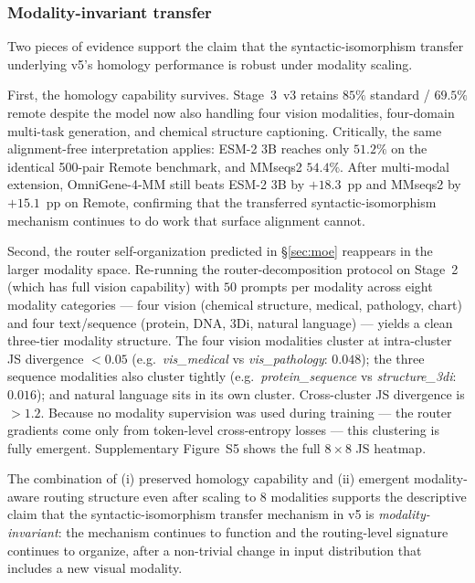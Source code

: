 \documentclass[11pt]{article}
\begin{document}
\subsubsection{Modality-invariant transfer}

Two pieces of evidence support the claim that the syntactic-isomorphism transfer underlying v5's homology performance is robust under modality scaling.

First, the homology capability survives. Stage~3~v3 retains $85\%$ standard / $69.5\%$ remote despite the model now also handling four vision modalities, four-domain multi-task generation, and chemical structure captioning. Critically, the same alignment-free interpretation applies: ESM-2 3B reaches only $51.2\%$ on the identical 500-pair Remote benchmark, and MMseqs2 $54.4\%$. After multi-modal extension, OmniGene-4-MM still beats ESM-2 3B by $+18.3$~pp and MMseqs2 by $+15.1$~pp on Remote, confirming that the transferred syntactic-isomorphism mechanism continues to do work that surface alignment cannot.

Second, the router self-organization predicted in \S\ref{sec:moe} reappears in the larger modality space. Re-running the router-decomposition protocol on Stage~2 (which has full vision capability) with $50$ prompts per modality across eight modality categories --- four vision (chemical structure, medical, pathology, chart) and four text/sequence (protein, DNA, 3Di, natural language) --- yields a clean three-tier modality structure. The four vision modalities cluster at intra-cluster JS divergence $<0.05$ (e.g.\ \textit{vis\_medical} vs \textit{vis\_pathology}: $0.048$); the three sequence modalities also cluster tightly (e.g.\ \textit{protein\_sequence} vs \textit{structure\_3di}: $0.016$); and natural language sits in its own cluster. Cross-cluster JS divergence is $>1.2$. Because no modality supervision was used during training --- the router gradients come only from token-level cross-entropy losses --- this clustering is fully emergent. Supplementary Figure~S5 shows the full $8\!\times\!8$ JS heatmap.

The combination of (i) preserved homology capability and (ii) emergent modality-aware routing structure even after scaling to 8 modalities supports the descriptive claim that the syntactic-isomorphism transfer mechanism in v5 is \emph{modality-invariant}: the mechanism continues to function and the routing-level signature continues to organize, after a non-trivial change in input distribution that includes a new visual modality.
\end{document}
